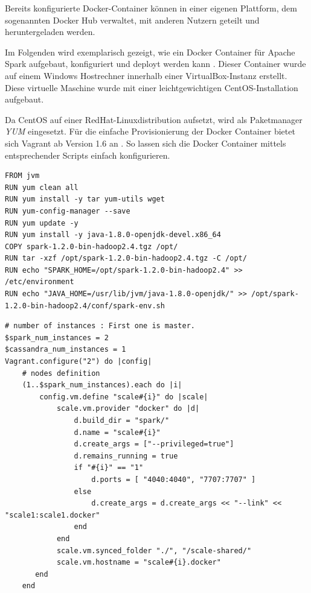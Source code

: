 Bereits konfigurierte Docker-Container können in einer eigenen Plattform, dem sogenannten Docker Hub verwaltet, mit anderen Nutzern geteilt und heruntergeladen werden. 

Im Folgenden wird exemplarisch gezeigt, wie ein Docker Container für Apache Spark aufgebaut, konfiguriert und deployt werden kann . Dieser Container wurde auf einem Windows Hostrechner innerhalb einer VirtualBox-Instanz erstellt. Diese virtuelle Maschine wurde mit einer leichtgewichtigen CentOS-Installation aufgebaut. 

Da CentOS auf einer RedHat-Linuxdistribution aufsetzt, wird als Paketmanager \textit{YUM} eingesetzt. Für die einfache Provisionierung der Docker Container bietet sich Vagrant ab Version 1.6 an . So lassen sich die Docker Container mittels entsprechender Scripts einfach konfigurieren. 

\begin{lstlisting}[label=vagrant setup jvm-spark,caption=Setup JVM with Spark]
FROM jvm
RUN yum clean all
RUN yum install -y tar yum-utils wget
RUN yum-config-manager --save 
RUN yum update -y
RUN yum install -y java-1.8.0-openjdk-devel.x86_64
COPY spark-1.2.0-bin-hadoop2.4.tgz /opt/
RUN tar -xzf /opt/spark-1.2.0-bin-hadoop2.4.tgz -C /opt/
RUN echo "SPARK_HOME=/opt/spark-1.2.0-bin-hadoop2.4" >> /etc/environment
RUN echo "JAVA_HOME=/usr/lib/jvm/java-1.8.0-openjdk/" >> /opt/spark-1.2.0-bin-hadoop2.4/conf/spark-env.sh

\end{lstlisting}

\begin{lstlisting}[label=vagrant setup jvm-spark,caption=Setup JVM with Spark]
# number of instances : First one is master.
$spark_num_instances = 2
$cassandra_num_instances = 1
Vagrant.configure("2") do |config|
    # nodes definition
    (1..$spark_num_instances).each do |i|
        config.vm.define "scale#{i}" do |scale|
            scale.vm.provider "docker" do |d|
                d.build_dir = "spark/"
                d.name = "scale#{i}"
                d.create_args = ["--privileged=true"]
                d.remains_running = true
                if "#{i}" == "1"
                    d.ports = [ "4040:4040", "7707:7707" ] 
                else
                    d.create_args = d.create_args << "--link" << "scale1:scale1.docker"
                end
            end
            scale.vm.synced_folder "./", "/scale-shared/"
            scale.vm.hostname = "scale#{i}.docker"
       end 
    end

\end{lstlisting}




